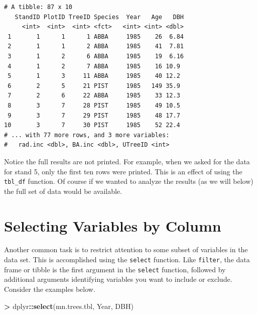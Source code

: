 \documentclass[]{krantz}
\makeatletter
\newenvironment{Shaded}{\begin{snugshade}}{\end{snugshade}}
\newcommand{\DecValTok}[1]{\textcolor[rgb]{0.06,0.06,0.06}{#1}}
\newcommand{\KeywordTok}[1]{\textcolor[rgb]{0.27,0.27,0.27}{\textbf{#1}}}
\newcommand{\NormalTok}[1]{#1}
\newcommand{\OperatorTok}[1]{\textcolor[rgb]{0.43,0.43,0.43}{\textbf{#1}}}
\newcommand{\StringTok}[1]{\textcolor[rgb]{0.5,0.5,0.5}{#1}}
\newenvironment{kframe}{%
\medskip{}
\setlength{\fboxsep}{.8em}
 \def\at@end@of@kframe{}%
 \ifinner\ifhmode%
  \def\at@end@of@kframe{\end{minipage}}%
  \begin{minipage}{\columnwidth}%
 \fi\fi%
 \def\FrameCommand##1{\hskip\@totalleftmargin \hskip-\fboxsep
 \colorbox{shadecolor}{##1}\hskip-\fboxsep
     \hskip-\linewidth \hskip-\@totalleftmargin \hskip\columnwidth}%
 \MakeFramed {\advance\hsize-\width
   \@totalleftmargin\z@ \linewidth\hsize
   \@setminipage}}%
 {\par\unskip\endMakeFramed%
 \at@end@of@kframe}
\renewenvironment{Shaded}{\begin{kframe}}{\end{kframe}}
\makeatother
\begin{document}
\begin{Shaded}
\end{Shaded}

\begin{verbatim}
# A tibble: 87 x 10
   StandID PlotID TreeID Species  Year   Age   DBH
     <int>  <int>  <int> <fct>   <int> <int> <dbl>
 1       1      1      1 ABBA     1985    26  6.84
 2       1      1      2 ABBA     1985    41  7.81
 3       1      2      6 ABBA     1985    19  6.16
 4       1      2      7 ABBA     1985    16 10.9 
 5       1      3     11 ABBA     1985    40 12.2 
 6       2      5     21 PIST     1985   149 35.9 
 7       2      6     22 ABBA     1985    33 12.3 
 8       3      7     28 PIST     1985    49 10.5 
 9       3      7     29 PIST     1985    48 17.7 
10       3      7     30 PIST     1985    52 22.4 
# ... with 77 more rows, and 3 more variables:
#   rad.inc <dbl>, BA.inc <dbl>, UTreeID <int>
\end{verbatim}

Notice the full results are not printed. For example, when we asked for the data for stand 5, only the first ten rows were printed. This is an effect of using the \texttt{tbl\_df} function. Of course if we wanted to analyze the results (as we will below) the full set of data would be available.

\hypertarget{selecting-variables-by-column}{%
\section{Selecting Variables by Column}\label{selecting-variables-by-column}}

Another common task is to restrict attention to some subset of variables in the data set. This is accomplished using the \texttt{select} function. Like \texttt{filter}, the data frame or tibble is the first argument in the \texttt{select} function, followed by additional arguments identifying variables you want to include or exclude. Consider the examples below.

\begin{Shaded}
\begin{Highlighting}[]
\OperatorTok{>}\StringTok{ }\NormalTok{dplyr}\OperatorTok{::}\KeywordTok{select}\NormalTok{(mn.trees.tbl, Year, DBH)}
\end{Highlighting}
\end{Shaded}
\end{document}
